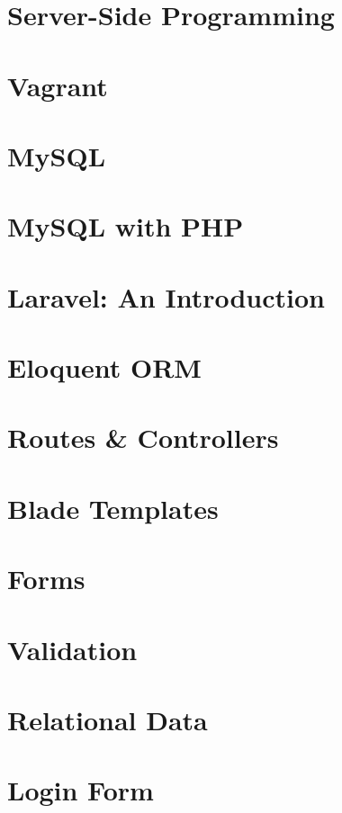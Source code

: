 \documentclass[b5paper,openany]{book}
\begin{document}
\tp


\tableofcontents




\chapter{Server-Side Programming}

\chapter{Vagrant}

\chapter{MySQL}

\chapter{MySQL with PHP}

\chapter{Laravel: An Introduction}


\chapter{Eloquent ORM}


\chapter{Routes \& Controllers}


\chapter{Blade Templates}

\chapter{Forms}


\chapter{Validation}


\chapter{Relational Data}


\chapter{Login Form}







\end{document}
